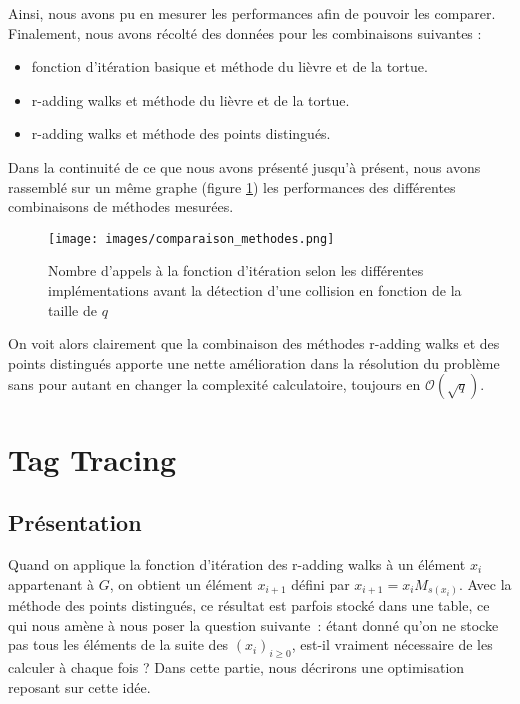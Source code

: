     Ainsi, nous avons pu en mesurer les performances afin de pouvoir les comparer. Finalement, nous avons récolté des données pour les combinaisons suivantes :

    \begin{itemize}
      \item fonction d'itération basique et méthode du lièvre et de la tortue.
      \item r-adding walks et méthode du lièvre et de la tortue.
      \item r-adding walks et méthode des points distingués.
    \end{itemize}

    Dans la continuité de ce que nous avons présenté jusqu'à présent, nous avons rassemblé sur un même graphe (figure \ref{fig:comparatif}) les performances des différentes combinaisons de méthodes mesurées.

    \begin{figure}
      \center{}
      \texttt{[image: images/comparaison\_methodes.png]}
      \caption{Nombre d'appels à la fonction d'itération selon les différentes implémentations avant la détection d'une collision en fonction de la taille de $q$}
      \label{fig:comparatif}
    \end{figure}

    On voit alors clairement que la combinaison des méthodes r-adding walks et des points distingués apporte une nette amélioration dans la résolution du problème sans pour autant en changer la complexité calculatoire, toujours en $\mathcal{O}(\sqrt{q})$.


    \section{Tag Tracing}
      \subsection{Présentation}
      Quand on applique la fonction d'itération des r-adding walks à un élément $x_i$ appartenant à $G$, on obtient un élément $x_{i+1}$ défini par $x_{i+1} = x_i M_{s(x_i)}$. Avec la méthode des points distingués, ce résultat est parfois stocké dans une table, ce qui nous amène à nous poser la question suivante~: étant donné qu'on ne stocke pas tous les éléments de la suite des $(x_i)_{i \ge 0}$, est-il vraiment nécessaire de les calculer à chaque fois ? Dans cette partie, nous décrirons une optimisation reposant sur cette idée.


